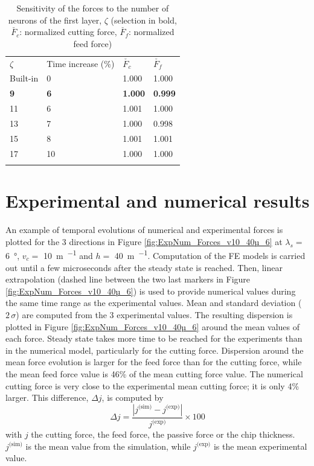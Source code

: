 \documentclass[preprint,12pt,times]{elsarticle}
\begin{document}
%
\begin{table}[!h]
\begin{center}
\caption{\label{tab:NbNeurons} Sensitivity of the forces to the number of neurons of the first layer, $\zeta$
(selection in bold, $\check{F_c}$: normalized cutting force, $\check{F_f}$: normalized feed force)}
\begin{tabular}{llll}
\hline\noalign{\smallskip}
$\zeta$  & Time increase (\%) & $\check{F_c}$ & $\check{F_f}$\\
\noalign{\smallskip}\hline\noalign{\smallskip}
Built-in & 0 & 1.000 & 1.000\\
\textbf{9} & \textbf{6} & \textbf{1.000} & \textbf{0.999}\\
11 & 6 & 1.001 & 1.000\\
13 & 7 & 1.000 & 0.998\\
15 & 8 & 1.001 & 1.001\\
17 & 10 & 1.000 & 1.000\\
\noalign{\smallskip}\hline
\end{tabular}
\end{center}
\end{table}
%

\section{Experimental and numerical results\label{sec:ExpNumResults}}
\label{Results}

An example of temporal evolutions of numerical and experimental forces is plotted for the 3 directions in Figure \ref{fig:ExpNum_Forces_v10_40µ_6} at $\lambda_s =$ \qty{6}{\degree}, $v_c =$ \qty{10}{\m\per\min} and $h =$ \qty{40}{\m\per\min}. Computation of the FE models is carried out until a few microseconds after the steady state is reached. Then, linear extrapolation (dashed line between the two last markers in Figure \ref{fig:ExpNum_Forces_v10_40µ_6}) is used to provide numerical values during the same time range as the experimental values. Mean and standard deviation ($2\,\sigma$) are computed from the 3 experimental values. The resulting dispersion is plotted in Figure \ref{fig:ExpNum_Forces_v10_40µ_6} around the mean values of each force. Steady state takes more time to be reached for the experiments than in the numerical model, particularly for the cutting force. Dispersion around the mean force evolution is larger for the feed force than for the cutting force, while the mean feed force value is 46\% of the mean cutting force value. The numerical cutting force is very close to the experimental mean cutting force; it is only 4\% larger. This difference, $\Delta j$, is computed by
%
\begin{equation}\label{eq:diff}
	\Delta j = \frac{\left|j^\text{(sim)} - j^\text{(exp)}\right|}{j^\text{(exp)}}\times 100
\end{equation}
%
with $j$ the cutting force, the feed force, the passive force or the chip thickness. $j^\text{(sim)}$ is the mean value from the simulation, while $j^\text{(exp)}$ is the mean experimental value.
\end{document}
